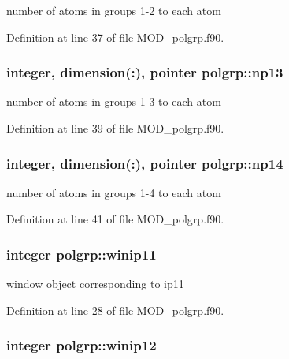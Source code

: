 number of atoms in groups 1-\/2 to each atom 



Definition at line 37 of file M\-O\-D\-\_\-polgrp.\-f90.

\hypertarget{classpolgrp_a1b59e6c5e0f2d496d3c5610650dd4f4a}{
\subsubsection[{np13}]{\setlength{\rightskip}{0pt plus 5cm}integer, dimension(\-:), pointer polgrp\-::np13}}\label{classpolgrp_a1b59e6c5e0f2d496d3c5610650dd4f4a}


number of atoms in groups 1-\/3 to each atom 



Definition at line 39 of file M\-O\-D\-\_\-polgrp.\-f90.

\hypertarget{classpolgrp_a850234d75a00647d662c56c2da9cc3a1}{
\subsubsection[{np14}]{\setlength{\rightskip}{0pt plus 5cm}integer, dimension(\-:), pointer polgrp\-::np14}}\label{classpolgrp_a850234d75a00647d662c56c2da9cc3a1}


number of atoms in groups 1-\/4 to each atom 



Definition at line 41 of file M\-O\-D\-\_\-polgrp.\-f90.

\hypertarget{classpolgrp_ab6396614f84e93532e2c725526d2620b}{
\subsubsection[{winip11}]{\setlength{\rightskip}{0pt plus 5cm}integer polgrp\-::winip11}}\label{classpolgrp_ab6396614f84e93532e2c725526d2620b}


window object corresponding to ip11 



Definition at line 28 of file M\-O\-D\-\_\-polgrp.\-f90.

\hypertarget{classpolgrp_a632031755a8a35eb397f2ca01469c9c2}{
\subsubsection[{winip12}]{\setlength{\rightskip}{0pt plus 5cm}integer polgrp\-::winip12}}\label{classpolgrp_a632031755a8a35eb397f2ca01469c9c2}


